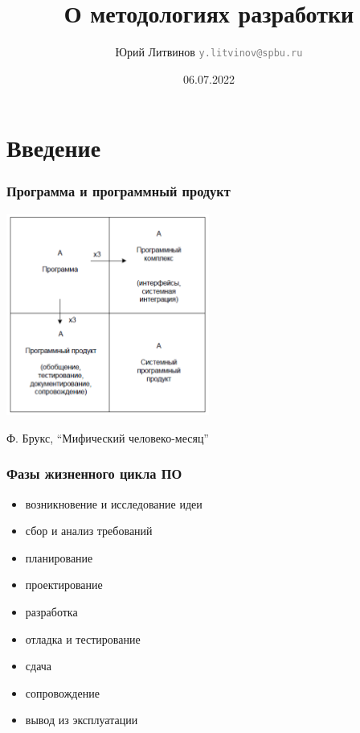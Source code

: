 \documentclass[xetex,mathserif,serif]{beamer}
\title{О методологиях разработки}
\author[Юрий Литвинов]{Юрий Литвинов \newline \textcolor{gray}{\small\texttt{y.litvinov@spbu.ru}}}
\date{06.07.2022}
\begin{document}
    
    \frame{\titlepage}

    \section{Введение}
    
    \begin{frame}
        \frametitle{Программа и программный продукт}
        \begin{center}
            \includegraphics[width=0.5\textwidth]{mythical-man-month.png}
        \end{center}
        \begin{center}
            Ф. Брукс, ``Мифический человеко-месяц''
        \end{center}
    \end{frame}

    \begin{frame}
        \frametitle{Фазы жизненного цикла ПО}
        \begin{itemize}
            \item возникновение и исследование идеи
            \item сбор и анализ требований
            \item планирование 
            \item проектирование
            \item разработка
            \item отладка и тестирование
            \item сдача
            \item сопровождение
            \item вывод из эксплуатации
        \end{itemize}
    \end{frame}
\end{document}
